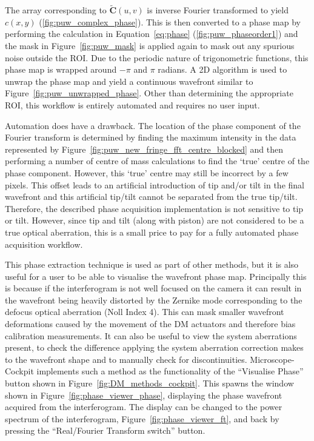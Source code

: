 The array corresponding to $\tilde{\boldsymbol{C}}(u,v)$ is inverse Fourier transformed to yield $c(x,y)$ (\ref{fig:puw_complex_phase}). This is then converted to a phase map by performing the calculation in Equation~\ref{eq:phase} (\ref{fig:puw_phaseorder1}) and the mask in Figure~\ref{fig:puw_mask} is applied again to mask out any spurious noise outside the ROI. Due to the periodic nature of trigonometric functions, this phase map is wrapped around $-\pi$ and $\pi$ radians. A 2D  algorithm is used to unwrap the phase map and yield a continuous wavefront similar to  Figure~\ref{fig:puw_unwrapped_phase}\cite{herraez2002fast}. Other than determining the appropriate ROI, this workflow is entirely automated and requires no user input. 

Automation does have a drawback. The location of the phase component
of the Fourier transform is determined by finding the maximum
intensity in the data represented by
Figure~\ref{fig:puw_new_fringe_fft_centre_blocked} and then performing
a number of centre of mass calculations to find the `true' centre of
the phase component. However, this `true' centre may still be
incorrect by a few pixels. This offset leads to an artificial
introduction of tip and/or tilt in the final wavefront and this
artificial tip/tilt cannot be separated from the true
tip/tilt. Therefore, the described phase acquisition implementation is
not sensitive to tip or tilt. However, since tip and tilt (along with piston) are not considered to be a true optical aberration, this is a small price to pay for a fully automated phase acquisition workflow.

This phase extraction technique is used as part of other methods, but it is also useful for a user to be able to visualise the wavefront phase map. Principally this is because if the interferogram is not well focused on the camera it can result in the wavefront being heavily distorted by the Zernike mode corresponding to the defocus optical aberration (Noll Index 4). This can mask smaller wavefront deformations caused by the movement of the DM actuators and therefore bias calibration measurements. It can also be useful to view the system aberrations present, to check the difference applying the system aberration correction makes to the wavefront shape and to manually check for discontinuities. Microscope-Cockpit implements such a method as the functionality of the ``Visualise Phase'' button shown in Figure~\ref{fig:DM_methods_cockpit}. This spawns the window shown in Figure~\ref{fig:phase_viewer_phase}, displaying the phase wavefront acquired from the interferogram. The display can be changed to the power spectrum of the interferogram, Figure~\ref{fig:phase_viewer_ft}, and back by pressing the ``Real/Fourier Transform switch'' button. 


